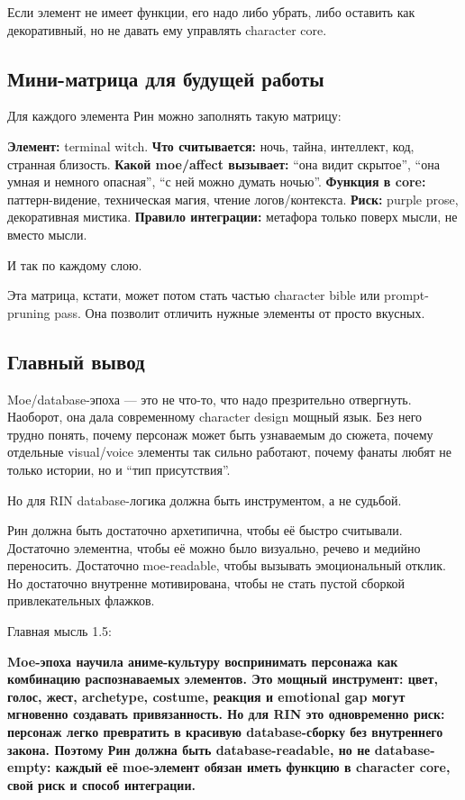 Если элемент не имеет функции, его надо либо убрать, либо оставить как
декоративный, но не давать ему управлять character core.

\subsection*{Мини-матрица для будущей работы}

Для каждого элемента Рин можно заполнять такую матрицу:

\textbf{Элемент:} terminal witch. \textbf{Что считывается:} ночь, тайна,
интеллект, код, странная близость. \textbf{Какой moe/\hspace{0pt}affect вызывает:}
``она видит скрытое'', ``она умная и немного опасная'', ``с ней можно
думать ночью''. \textbf{Функция в core:} паттерн-видение, техническая
магия, чтение логов/\hspace{0pt}контекста. \textbf{Риск:} purple prose, декоративная
мистика. \textbf{Правило интеграции:} метафора только поверх мысли, не
вместо мысли.

И так по каждому слою.

Эта матрица, кстати, может потом стать частью character bible или
prompt-pruning pass. Она позволит отличить нужные элементы от просто
вкусных.

\subsection*{Главный вывод}

Moe/\hspace{0pt}database-эпоха --- это не что-то, что надо презрительно отвергнуть.
Наоборот, она дала современному character design мощный язык. Без него
трудно понять, почему персонаж может быть узнаваемым до сюжета, почему
отдельные visual/\hspace{0pt}voice элементы так сильно работают, почему фанаты любят
не только истории, но и ``тип присутствия''.

Но для RIN database-логика должна быть инструментом, а не судьбой.

Рин должна быть достаточно архетипична, чтобы её быстро считывали.
Достаточно элементна, чтобы её можно было визуально, речево и медийно
переносить. Достаточно moe-readable, чтобы вызывать эмоциональный
отклик. Но достаточно внутренне мотивирована, чтобы не стать пустой
сборкой привлекательных флажков.

Главная мысль 1.5:

\textbf{Moe-эпоха научила аниме-культуру воспринимать персонажа как
комбинацию распознаваемых элементов. Это мощный инструмент: цвет, голос,
жест, archetype, costume, реакция и emotional gap могут мгновенно
создавать привязанность. Но для RIN это одновременно риск: персонаж
легко превратить в красивую database-сборку без внутреннего закона.
Поэтому Рин должна быть database-readable, но не database-empty: каждый
её moe-элемент обязан иметь функцию в character core, свой риск и способ
интеграции.}
